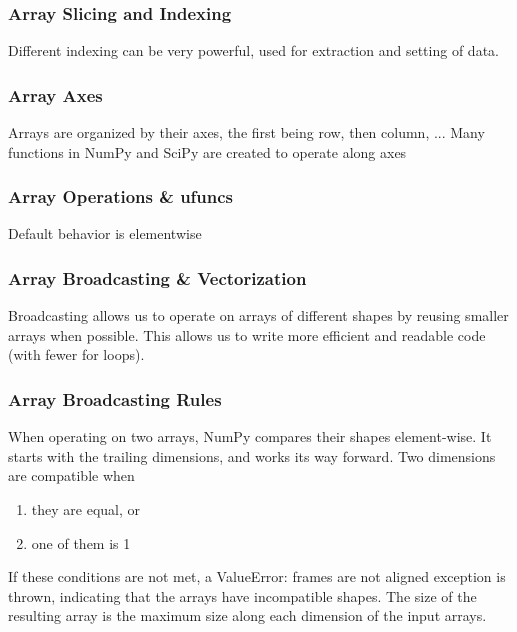 \documentclass{beamer}
\begin{document}
\begin{frame}
\frametitle{Array Slicing and Indexing}
Different indexing can be very powerful, used for extraction and setting of data.
\lstset{basicstyle=\scriptsize}
\end{frame}

\begin{frame}
\frametitle{Array Axes}
Arrays are organized by their axes, the first being row, then column, ...
\lstset{basicstyle=\scriptsize}
Many functions in NumPy and SciPy are created to operate along axes
\end{frame}


\begin{frame}
\frametitle{Array Operations \& ufuncs}
Default behavior is elementwise 
\lstset{basicstyle=\scriptsize}
\end{frame}

\begin{frame}
\frametitle{Array Broadcasting \& Vectorization}
Broadcasting allows us to operate on arrays of different shapes by reusing smaller arrays when possible. This allows us to write more efficient and readable code (with fewer for loops).
\end{frame}

\begin{frame}
\frametitle{Array Broadcasting Rules}
When operating on two arrays, NumPy compares their shapes element-wise. It starts with the trailing dimensions, and works its way forward. Two dimensions are compatible when
\begin{enumerate}
\item they are equal, or
\item one of them is 1
\end{enumerate}
If these conditions are not met, a ValueError: frames are not aligned exception is thrown, indicating that the arrays have incompatible shapes. The size of the resulting array is the maximum size along each dimension of the input arrays.
\end{frame}
\end{document}
